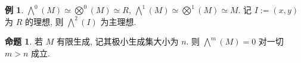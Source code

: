\documentclass{MainStyle}
\theoremstyle{definition}
\newtheorem{example}{例}
\theoremstyle{definition}
\theoremstyle{definition}
\theoremstyle{definition}
\newtheorem{proposition}{命题}
\theoremstyle{definition}
\theoremstyle{definition}
\theoremstyle{definition}
\theoremstyle{remark}
\theoremstyle{remark}
\begin{document}
\begin{example}
    $\bigwedge^0(M)\simeq \bigotimes^0(M)\simeq R$, $\bigwedge ^1(M)\simeq \bigotimes ^1(M)\simeq M$. 记 $I:=(x,y)$ 为 $R$ 的理想, 则 $\bigwedge^2(I)$ 为主理想.
\end{example}

\begin{proposition}
    若 $M$ 有限生成, 记其极小生成集大小为 $n$. 则 $\bigwedge^m(M)=0$ 对一切 $m>n$ 成立.
\end{proposition}
\end{document}
